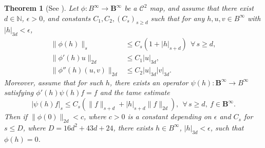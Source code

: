 \documentclass[reqno,11pt,letterpaper]{amsart}
\numberwithin{equation}{section}
\numberwithin{figure}{section}
\newtheorem{thm}{Theorem}[section]
\theoremstyle{definition}
\theoremstyle{remark}
\newcommand{\mc}{\mathcal}
\newcommand{\cC}{\mc C}
\newcommand{\N}{\mathbb{N}}
\newcommand{\bfB}{\mathbf{B}}
\newcommand{\eps}{\epsilon}
\begin{document}
\begin{thm}[See \cite{SaintRaymondNashMoser}]
\label{ThmPfNM}
  Let $\phi\colon B^\infty\to\bfB^\infty$ be a $\cC^2$ map, and assume that there exist $d\in\N$, $\eps>0$, and constants $C_1,C_2,(C_s)_{s\geq d}$ such that for any $h,u,v\in B^\infty$ with $|h|_{3 d}<\eps$,
  \begin{subequations}
  \begin{align}
  \label{EqPfNM1}
    \|\phi(h)\|_s &\leq C_s(1+|h|_{s+d})\ \ \forall\,s\geq d, \\
  \label{EqPfNM2}
    \|\phi'(h)u\|_{2 d} &\leq C_1|u|_{3 d}, \\
  \label{EqPfNM3}
    \|\phi''(h)(u,v)\|_{2 d} &\leq C_2|u|_{3 d}|v|_{3 d}.
  \end{align}
  \end{subequations}
  Moreover, assume that for such $h$, there exists an operator $\psi(h)\colon\bfB^\infty\to B^\infty$ satisfying $\phi'(h)\psi(h)f=f$ and the tame estimate
  \begin{equation}
  \label{EqPfNMTame}
    |\psi(h)f|_s \leq C_s(\|f\|_{s+d}+|h|_{s+d}\|f\|_{2 d}),\ \ \forall\,s\geq d,\ f\in\bfB^\infty.
  \end{equation}
  Then if $\|\phi(0)\|_{2 d}<c$, where $c>0$ is a constant depending on $\eps$ and $C_s$ for $s\leq D$, where $D=16 d^2+43 d+24$, there exists $h\in B^\infty$, $|h|_{3 d}<\eps$, such that $\phi(h)=0$.
\end{thm}
\end{document}
